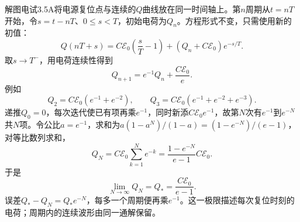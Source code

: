 \documentclass[UTF8,fontset=fandol,a4paper,11pt]{ctexart}
\begin{document}
解图电试3.5A将电源复位点与连续的$Q$曲线放在同一时间轴上。第$n$周期从$t=nT$开始，令$s=t-nT$、$0\le s<T$，初始电荷为$Q_n$。方程形式不变，只需使用新的初值：
\[
\boxed{Q(nT+s)
=C\mathcal E_0\left(\frac sT-1\right)
+(Q_n+C\mathcal E_0)e^{-s/T}}.
\]
取$s\to T^-$，用电荷连续性得到
\[
Q_{n+1}=e^{-1}Q_n+\frac{C\mathcal E_0}{e}.
\]
例如
\[
Q_2=C\mathcal E_0(e^{-1}+e^{-2}),\qquad
Q_3=C\mathcal E_0(e^{-1}+e^{-2}+e^{-3}).
\]
递推$Q_0=0$，每次迭代使已有项再乘$e^{-1}$，同时新添$C\mathcal E_0e^{-1}$，故第$N$次有$e^{-1}$到$e^{-N}$共$N$项。令公比$a=e^{-1}$，求和为$a(1-a^N)/(1-a)=(1-e^{-N})/(e-1)$，对等比数列求和，
\[
Q_N=C\mathcal E_0\sum_{k=1}^Ne^{-k}
=\boxed{\frac{1-e^{-N}}{e-1}C\mathcal E_0}.
\]
于是
\[
\boxed{\lim_{N\to\infty}Q_N
=Q_*=\frac{C\mathcal E_0}{e-1}}.
\]
误差$Q_*-Q_N=Q_*e^{-N}$，每多一个周期便再乘$e^{-1}$。这一极限描述每次复位时刻的电荷；周期内的连续波形由同一通解保留。
\end{document}
